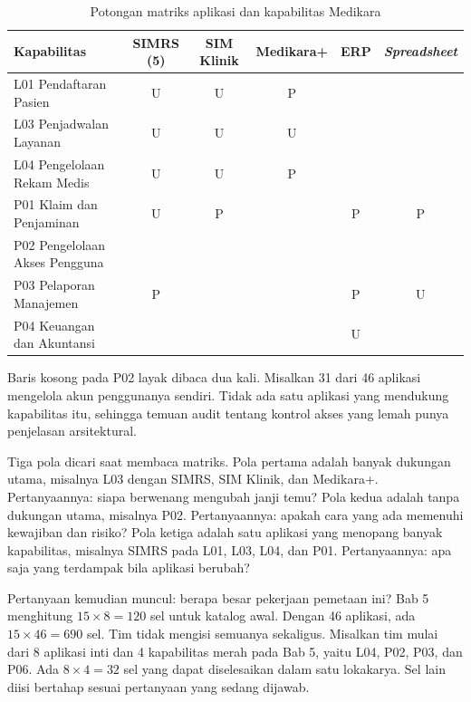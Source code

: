 \begin{table}[!htb]
  \centering
  \caption{Potongan matriks aplikasi dan kapabilitas Medikara}
  \label{tab:ch07-matriks}
  \small
  \begin{tabularx}{\textwidth}{>{\raggedright\arraybackslash}Xccccc}
    \hline
    \textbf{Kapabilitas} & \textbf{SIMRS (5)} & \textbf{SIM Klinik} & \textbf{Medikara+} & \textbf{ERP} & \textbf{\textit{Spreadsheet}} \\
    \hline
    L01 Pendaftaran Pasien & U & U & P & & \\
    \hline
    L03 Penjadwalan Layanan & U & U & U & & \\
    \hline
    L04 Pengelolaan Rekam Medis & U & U & P & & \\
    \hline
    P01 Klaim dan Penjaminan & U & P & & P & P \\
    \hline
    P02 Pengelolaan Akses Pengguna & & & & & \\
    \hline
    P03 Pelaporan Manajemen & P & & & P & U \\
    \hline
    P04 Keuangan dan Akuntansi & & & & U & \\
    \hline
  \end{tabularx}
\end{table}

Baris kosong pada P02 layak dibaca dua kali. Misalkan 31 dari 46 aplikasi mengelola akun penggunanya
sendiri. Tidak ada satu aplikasi yang mendukung kapabilitas itu, sehingga temuan audit tentang
kontrol akses yang lemah punya penjelasan arsitektural.

Tiga pola dicari saat membaca matriks. Pola pertama adalah banyak dukungan utama, misalnya L03 dengan
SIMRS, SIM Klinik, dan Medikara+. Pertanyaannya: siapa berwenang mengubah janji temu? Pola kedua adalah
tanpa dukungan utama, misalnya P02. Pertanyaannya: apakah cara yang ada memenuhi kewajiban dan risiko?
Pola ketiga adalah satu aplikasi yang menopang banyak kapabilitas, misalnya SIMRS pada L01, L03, L04, dan
P01. Pertanyaannya: apa saja yang terdampak bila aplikasi berubah?

Pertanyaan kemudian muncul: berapa besar pekerjaan pemetaan ini? Bab 5 menghitung
$15 \times 8 = 120$ sel untuk katalog awal. Dengan 46 aplikasi, ada $15 \times 46 = 690$ sel. Tim
tidak mengisi semuanya sekaligus. Misalkan tim mulai dari 8 aplikasi inti dan 4 kapabilitas merah
pada Bab 5, yaitu L04, P02, P03, dan P06. Ada $8 \times 4 = 32$ sel yang dapat diselesaikan dalam
satu lokakarya. Sel lain diisi bertahap sesuai pertanyaan yang sedang dijawab.

